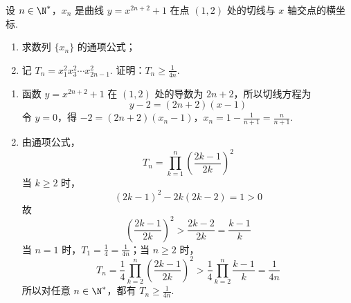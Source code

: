 \begin{problem}
设 \(n \in \N^*\)，\(x_n\) 是曲线 \(y = x^{2n+2} + 1\) 在点 \((1,2)\) 处的切线与 \(x\) 轴交点的横坐标.

\begin{enumerate}
\item 求数列 \( \{x_{n}\} \) 的通项公式；
\item 记 \(T_{n} = x_{1}^{2}x_{3}^{2}\cdots x_{2n - 1}^{2}\). 证明：\(T_{n} \geqslant \frac{1}{4n}\).
\end{enumerate}
\begin{solution}
\begin{enumerate}
\item 函数 \(y=x^{2n+2}+1\) 在 \((1,2)\) 处的导数为 \(2n+2\)，所以切线方程为
\[
y-2=(2n+2)(x-1)
\]
令 \(y=0\)，得
\(-2=(2n+2)(x_n-1)\)，\(x_n=1-\frac1{n+1}=\frac n{n+1}\).

\item 由通项公式，
\[
T_n=\prod_{k=1}^n\left(\frac{2k-1}{2k}\right)^2
\]
当 \(k\geqslant2\) 时，
\[
(2k-1)^2-2k(2k-2)=1>0
\]
故
\[
\left(\frac{2k-1}{2k}\right)^2>\frac{2k-2}{2k}=\frac{k-1}{k}
\]
当 \(n=1\) 时，\(T_1=\frac14=\frac1{4n}\)；当 \(n\geqslant2\) 时，
\[
T_n=\frac14\prod_{k=2}^n\left(\frac{2k-1}{2k}\right)^2
>\frac14\prod_{k=2}^n\frac{k-1}{k}=\frac1{4n}
\]
所以对任意 \(n\in\N^*\)，都有 \(T_n\geqslant\frac1{4n}\).
\end{enumerate}
\end{solution}
\end{problem}


